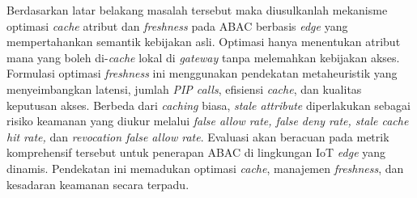 Berdasarkan latar belakang masalah tersebut maka diusulkanlah mekanisme optimasi \textit{cache} atribut dan \textit{freshness} pada ABAC berbasis \textit{edge} yang mempertahankan semantik kebijakan asli. Optimasi hanya menentukan atribut mana yang boleh di-\textit{cache} lokal di \textit{gateway} tanpa melemahkan kebijakan akses. Formulasi optimasi \textit{freshness} ini menggunakan pendekatan metaheuristik yang menyeimbangkan latensi, jumlah \textit{PIP calls}, efisiensi \textit{cache}, dan kualitas keputusan akses. Berbeda dari \textit{caching} biasa, \textit{stale attribute} diperlakukan sebagai risiko keamanan yang diukur melalui \textit{false allow rate, false deny rate, stale cache hit rate,} dan \textit{revocation false allow rate}. Evaluasi akan beracuan pada metrik komprehensif tersebut untuk penerapan ABAC di lingkungan IoT \textit{edge} yang dinamis. Pendekatan ini memadukan optimasi \textit{cache}, manajemen \textit{freshness}, dan kesadaran keamanan secara terpadu.